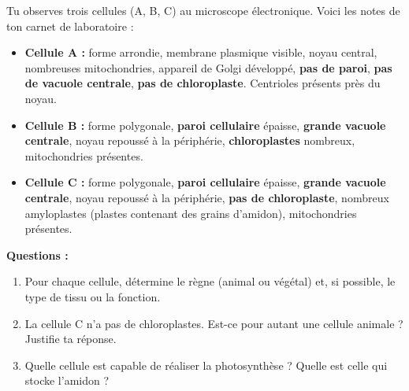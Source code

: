 \documentclass[11pt]{article}
\begin{document}
\begin{exercice}
Tu observes trois cellules (A, B, C) au microscope électronique. Voici les notes de ton carnet de laboratoire :
\begin{itemize}
    \item \textbf{Cellule A :} forme arrondie, membrane plasmique visible, noyau central, nombreuses mitochondries, appareil de Golgi développé, \textbf{pas de paroi}, \textbf{pas de vacuole centrale}, \textbf{pas de chloroplaste}. Centrioles présents près du noyau.
    \item \textbf{Cellule B :} forme polygonale, \textbf{paroi cellulaire} épaisse, \textbf{grande vacuole centrale}, noyau repoussé à la périphérie, \textbf{chloroplastes} nombreux, mitochondries présentes.
    \item \textbf{Cellule C :} forme polygonale, \textbf{paroi cellulaire} épaisse, \textbf{grande vacuole centrale}, noyau repoussé à la périphérie, \textbf{pas de chloroplaste}, nombreux amyloplastes (plastes contenant des grains d'amidon), mitochondries présentes.
\end{itemize}
\textbf{Questions :}
\begin{enumerate}
    \item Pour chaque cellule, détermine le règne (animal ou végétal) et, si possible, le type de tissu ou la fonction.
    \item La cellule C n'a pas de chloroplastes. Est-ce pour autant une cellule animale ? Justifie ta réponse.
    \item Quelle cellule est capable de réaliser la photosynthèse ? Quelle est celle qui stocke l'amidon ?
\end{enumerate}
\end{exercice}
\end{document}
